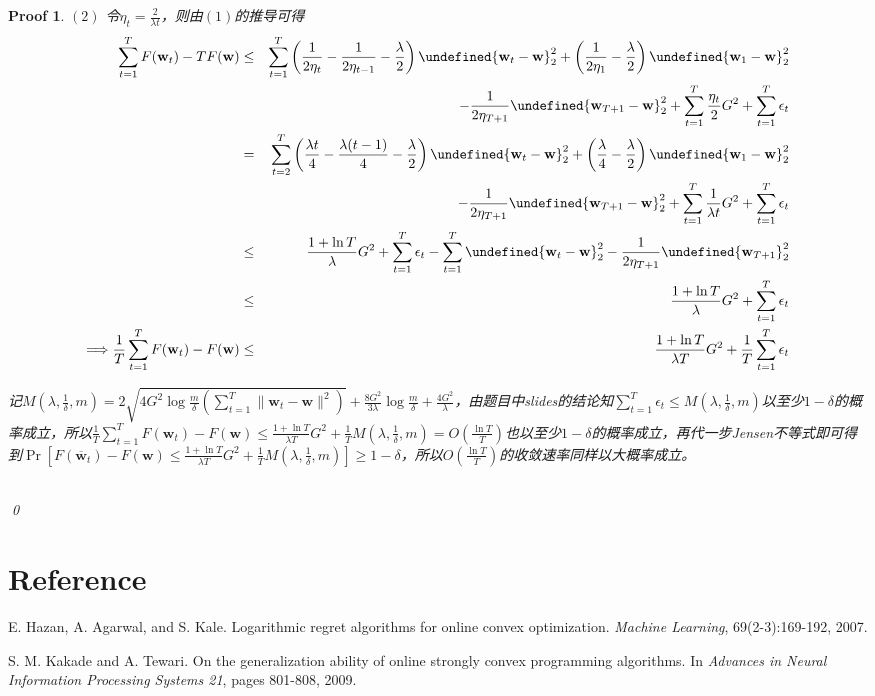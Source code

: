 \documentclass[a4paper,UTF8]{article}
\let\norm\undefined %
\DeclarePairedDelimiter\norm{\lVert}{\rVert}
\numberwithin{equation}{section}
\newtheorem*{myProof}{Proof}
\begin{document}
\begin{myProof}
$(2)$ 令$\eta_t = \frac{2}{\lambda t}$，则由$(1)$的推导可得
\begin{eqnarray*}
\sum_{t=1}^T F(\mathbf{w}_t) - TF(\mathbf{w}) &\le& \sum_{t=1}^T \left( \frac{1}{2\eta_t} - \frac{1}{2\eta_{t-1}} - \frac{\lambda}{2} \right) \norm{\mathbf{w}_t - \mathbf{w}}_2^2 + \left( \frac{1}{2\eta_1} - \frac{\lambda}{2} \right) \norm{\mathbf{w}_1 - \mathbf{w}}_2^2 \\
&& - \frac{1}{2\eta_{T+1}}\norm{\mathbf{w}_{T+1} - \mathbf{w}}_2^2 + \sum_{t=1}^T \frac{\eta_t}{2} G^2 + \sum_{t=1}^T \epsilon_t \\
&=& \sum_{t=2}^T \left( \frac{\lambda t}{4} - \frac{\lambda (t-1)}{4} - \frac{\lambda}{2} \right) \norm{\mathbf{w}_t - \mathbf{w}}_2^2 + \left( \frac{\lambda}{4} - \frac{\lambda}{2} \right) \norm{\mathbf{w}_1 - \mathbf{w}}_2^2 \\
&& - \frac{1}{2\eta_{T+1}}\norm{\mathbf{w}_{T+1} - \mathbf{w}}_2^2 + \sum_{t=1}^T \frac{1}{\lambda t} G^2 + \sum_{t=1}^T \epsilon_t \\
&\le& \frac{1 + \ln T}{\lambda}G^2 + \sum_{t=1}^T \epsilon_t - \sum_{t=1}^T \norm{\mathbf{w}_t - \mathbf{w}}_2^2 - \frac{1}{2\eta_{T+1}}\norm{\mathbf{w}_{T+1}}_2^2 \\
&\le& \frac{1 + \ln T}{\lambda}G^2 + \sum_{t=1}^T \epsilon_t \\
\Longrightarrow \frac{1}{T}\sum_{t=1}^T F(\mathbf{w}_t) - F(\mathbf{w}) &\le& \frac{1 + \ln T}{\lambda T}G^2 + \frac{1}{T}\sum_{t=1}^T \epsilon_t
\end{eqnarray*}

记$M(\lambda, \frac{1}{\delta}, m) = 2\sqrt{ 4 G^2  \log \frac{m }{\delta} \left( \sum_{t=1}^T \|\mathbf{w}_t - \mathbf{w}\|^2\right)} +  \frac{8G^2}{3\lambda}   \log \frac{m }{\delta} + \frac{4G^2}{\lambda}$，由题目中slides的结论知$\sum_{t=1}^T \epsilon_t \le M(\lambda, \frac{1}{\delta}, m)$以至少$1-\delta$的概率成立，所以$\frac{1}{T}\sum_{t=1}^T F(\mathbf{w}_t) - F(\mathbf{w}) \le \frac{1 + \ln T}{\lambda T}G^2 + \frac{1}{T} M(\lambda, \frac{1}{\delta}, m) = O(\frac{\ln T}{T})$也以至少$1-\delta$的概率成立，再代一步Jensen不等式即可得到$\Pr [ F(\overline{\mathbf{w}}_t) - F(\mathbf{w}) \le \frac{1 + \ln T}{\lambda T}G^2 + \frac{1}{T} M(\lambda, \frac{1}{\delta}, m)] \ge 1 - \delta$，所以$O(\frac{\ln T}{T})$的收敛速率同样以大概率成立。

	~\\	
	\qed
\end{myProof}
\newpage
\section*{Reference}
\begin{enumerate}[ {[}1{]}]
\item E. Hazan, A. Agarwal, and S. Kale. Logarithmic regret algorithms for online convex optimization. \textit{Machine Learning}, 69(2-3):169-192, 2007.
\item S. M. Kakade and A. Tewari. On the generalization ability of online strongly convex programming algorithms. In \textit{Advances in Neural Information Processing Systems 21}, pages 801-808, 2009.
\end{enumerate}
\end{document}
